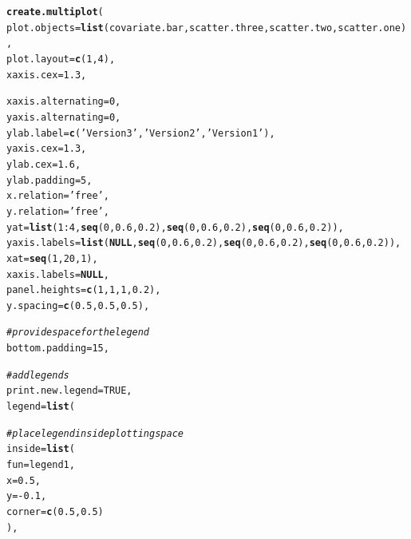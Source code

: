 \documentclass[letterpaper]{report}\usepackage[]{graphicx}\usepackage[]{color}
\makeatletter
\newcommand{\hlnum}[1]{\textcolor[rgb]{0.686,0.059,0.569}{#1}}%
\newcommand{\hlstr}[1]{\textcolor[rgb]{0.192,0.494,0.8}{#1}}%
\newcommand{\hlcom}[1]{\textcolor[rgb]{0.678,0.584,0.686}{\textit{#1}}}%
\newcommand{\hlopt}[1]{\textcolor[rgb]{0,0,0}{#1}}%
\newcommand{\hlstd}[1]{\textcolor[rgb]{0.345,0.345,0.345}{#1}}%
\newcommand{\hlkwa}[1]{\textcolor[rgb]{0.161,0.373,0.58}{\textbf{#1}}}%
\newcommand{\hlkwc}[1]{\textcolor[rgb]{0.333,0.667,0.333}{#1}}%
\newcommand{\hlkwd}[1]{\textcolor[rgb]{0.737,0.353,0.396}{\textbf{#1}}}%
\newenvironment{kframe}{%
 \def\at@end@of@kframe{}%
 \ifinner\ifhmode%
  \def\at@end@of@kframe{\end{minipage}}%
  \begin{minipage}{\columnwidth}%
 \fi\fi%
 \def\FrameCommand##1{\hskip\@totalleftmargin \hskip-\fboxsep
 \colorbox{shadecolor}{##1}\hskip-\fboxsep
     \hskip-\linewidth \hskip-\@totalleftmargin \hskip\columnwidth}%
 \MakeFramed {\advance\hsize-\width
   \@totalleftmargin\z@ \linewidth\hsize
   \@setminipage}}%
 {\par\unskip\endMakeFramed%
 \at@end@of@kframe}
\newenvironment{knitrout}{}{} %
\makeatother
\begin{document}
\begin{knitrout}
\color{fgcolor}\begin{kframe}
\begin{alltt}
\hlkwd{create.multiplot}\hlstd{(}
    \hlkwc{plot.objects} \hlstd{=} \hlkwd{list}\hlstd{(covariate.bar, scatter.three, scatter.two, scatter.one),}
    \hlkwc{plot.layout} \hlstd{=} \hlkwd{c}\hlstd{(}\hlnum{1}\hlstd{,}\hlnum{4}\hlstd{),}
    \hlkwc{xaxis.cex} \hlstd{=} \hlnum{1.3}\hlstd{,}

    \hlkwc{xaxis.alternating} \hlstd{=} \hlnum{0}\hlstd{,}
    \hlkwc{yaxis.alternating} \hlstd{=} \hlnum{0}\hlstd{,}
    \hlkwc{ylab.label} \hlstd{=} \hlkwd{c}\hlstd{(}\hlstr{'Version 3'}\hlstd{,} \hlstr{'Version 2'}\hlstd{,} \hlstr{'Version 1'}\hlstd{),}
    \hlkwc{yaxis.cex} \hlstd{=} \hlnum{1.3}\hlstd{,}
    \hlkwc{ylab.cex} \hlstd{=} \hlnum{1.6}\hlstd{,}
    \hlkwc{ylab.padding} \hlstd{=} \hlnum{5}\hlstd{,}
    \hlkwc{x.relation} \hlstd{=} \hlstr{'free'}\hlstd{,}
    \hlkwc{y.relation} \hlstd{=} \hlstr{'free'}\hlstd{,}
    \hlkwc{yat} \hlstd{=} \hlkwd{list}\hlstd{(}\hlnum{1}\hlopt{:}\hlnum{4}\hlstd{,} \hlkwd{seq}\hlstd{(}\hlnum{0}\hlstd{,} \hlnum{0.6}\hlstd{,} \hlnum{0.2}\hlstd{),} \hlkwd{seq}\hlstd{(}\hlnum{0}\hlstd{,} \hlnum{0.6}\hlstd{,} \hlnum{0.2}\hlstd{),} \hlkwd{seq}\hlstd{(}\hlnum{0}\hlstd{,} \hlnum{0.6}\hlstd{,} \hlnum{0.2}\hlstd{)),}
    \hlkwc{yaxis.labels} \hlstd{=} \hlkwd{list}\hlstd{(}\hlkwa{NULL}\hlstd{,} \hlkwd{seq}\hlstd{(}\hlnum{0}\hlstd{,} \hlnum{0.6}\hlstd{,} \hlnum{0.2}\hlstd{),} \hlkwd{seq}\hlstd{(}\hlnum{0}\hlstd{,} \hlnum{0.6}\hlstd{,} \hlnum{0.2}\hlstd{),} \hlkwd{seq}\hlstd{(}\hlnum{0}\hlstd{,} \hlnum{0.6}\hlstd{,} \hlnum{0.2}\hlstd{)),}
    \hlkwc{xat} \hlstd{=} \hlkwd{seq}\hlstd{(}\hlnum{1}\hlstd{,} \hlnum{20}\hlstd{,} \hlnum{1}\hlstd{),}
    \hlkwc{xaxis.labels} \hlstd{=} \hlkwa{NULL}\hlstd{,}
    \hlkwc{panel.heights} \hlstd{=} \hlkwd{c}\hlstd{(}\hlnum{1}\hlstd{,} \hlnum{1}\hlstd{,} \hlnum{1}\hlstd{,} \hlnum{0.2}\hlstd{),}
    \hlkwc{y.spacing} \hlstd{=} \hlkwd{c}\hlstd{(}\hlnum{0.5}\hlstd{,} \hlnum{0.5}\hlstd{,} \hlnum{0.5}\hlstd{),}

    \hlcom{# provide space for the legend}
    \hlkwc{bottom.padding} \hlstd{=} \hlnum{15}\hlstd{,}

    \hlcom{# add legends}
    \hlkwc{print.new.legend} \hlstd{=} \hlnum{TRUE}\hlstd{,}
    \hlkwc{legend} \hlstd{=} \hlkwd{list}\hlstd{(}

        \hlcom{# place legend inside plotting space}
        \hlkwc{inside} \hlstd{=} \hlkwd{list}\hlstd{(}
            \hlkwc{fun} \hlstd{= legend1,}
            \hlkwc{x} \hlstd{=} \hlnum{0.5}\hlstd{,}
            \hlkwc{y} \hlstd{=} \hlopt{-}\hlnum{0.1}\hlstd{,}
            \hlkwc{corner} \hlstd{=} \hlkwd{c}\hlstd{(}\hlnum{0.5}\hlstd{,} \hlnum{0.5}\hlstd{)}
            \hlstd{),}


\end{alltt}
\end{kframe}
\end{knitrout}
\end{document}

